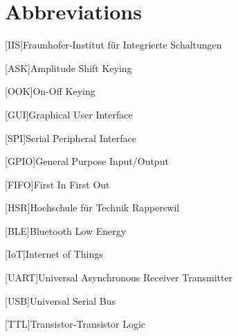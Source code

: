 \chapter*{Abbreviations}

\begin{acronym}
	[IIS]{Fraunhofer-Institut für Integrierte Schaltungen}
\end{acronym}

\begin{acronym}
	[ASK]{Amplitude Shift Keying}
\end{acronym}

\begin{acronym}
	[OOK]{On-Off Keying}
\end{acronym}

\begin{acronym}
	[GUI]{Graphical User Interface}
\end{acronym}

\begin{acronym}
	[SPI]{Serial Peripheral Interface}
\end{acronym}

\begin{acronym}
	[GPIO]{General Purpose Input/Output}
\end{acronym}

\begin{acronym}
	[FIFO]{First In First Out}
\end{acronym}

\begin{acronym}
	[HSR]{Hochschule für Technik Rapperswil}
\end{acronym}

\begin{acronym}
	[BLE]{Bluetooth Low Energy}
\end{acronym}

\begin{acronym}
	[IoT]{Internet of Things}
\end{acronym}

\begin{acronym}
	[UART]{Universal Asynchronous Receiver Transmitter}
\end{acronym}

\begin{acronym}
	[USB]{Universal Serial Bus}
\end{acronym}

\begin{acronym}
	[TTL]{Transistor-Transistor Logic}
\end{acronym}